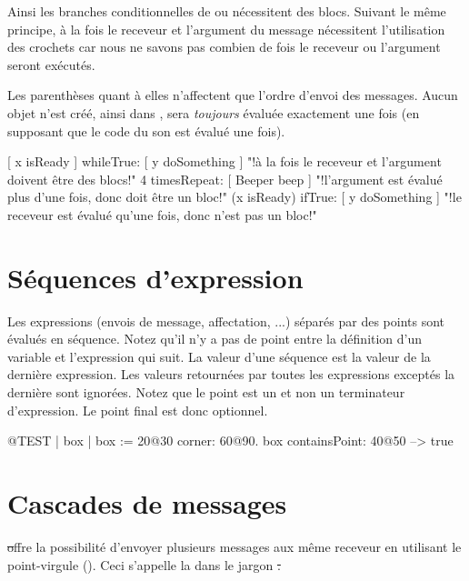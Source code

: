 \documentclass[a4paper,10pt,twoside]{book}
\begin{document}
Ainsi les branches conditionnelles de  ou  n\'ecessitent des blocs. Suivant le m\^eme principe, \`a la fois le receveur et l'argument du message  n\'ecessitent l'utilisation des crochets car nous ne savons pas combien de fois le receveur ou l'argument seront ex\'ecut\'es.

Les parenth\`eses quant \`a elles n'affectent que l'ordre d'envoi des messages.
Aucun objet n'est cr\'e\'e, ainsi dans ,  sera \emph{toujours} \'evalu\'ee exactement une fois (en supposant que le code du son est \'evalu\'e une fois).

\begin{code}{}
[ x isReady ] whileTrue: [ y doSomething ]   "!\`a la fois le receveur et l'argument doivent \^etre des blocs!"
4 timesRepeat: [ Beeper beep ]                   "!l'argument est \'evalu\'e plus d'une fois, donc doit \^etre un bloc!"
(x isReady) ifTrue: [ y doSomething ]           "!le receveur est \'evalu\'e qu'une fois, donc n'est pas un bloc!"
\end{code}

\section{S\'equences d'expression}
Les expressions (\ie envois de message, affectation, ...) s\'epar\'es par des points sont \'evalu\'es en s\'equence.
Notez qu'il n'y a pas de point entre la d\'efinition d'un variable et l'expression qui suit.
La valeur d'une s\'equence est la valeur de la derni\`ere expression. Les valeurs retourn\'ees par toutes les expressions except\'es la derni\`ere sont ignor\'ees. Notez que le point est un  et non un terminateur d'expression. Le point final est donc optionnel.

\begin{code}{@TEST}
| box |
box := 20@30 corner: 60@90.
box containsPoint: 40@50 --> true
\end{code}

\section{Cascades de messages}
\st offre la possibilit\'e d'envoyer plusieurs messages aux m\^eme receveur en utilisant le point-virgule (\ct{;}). Ceci s'appelle la  dans le jargon \st.
\end{document}

